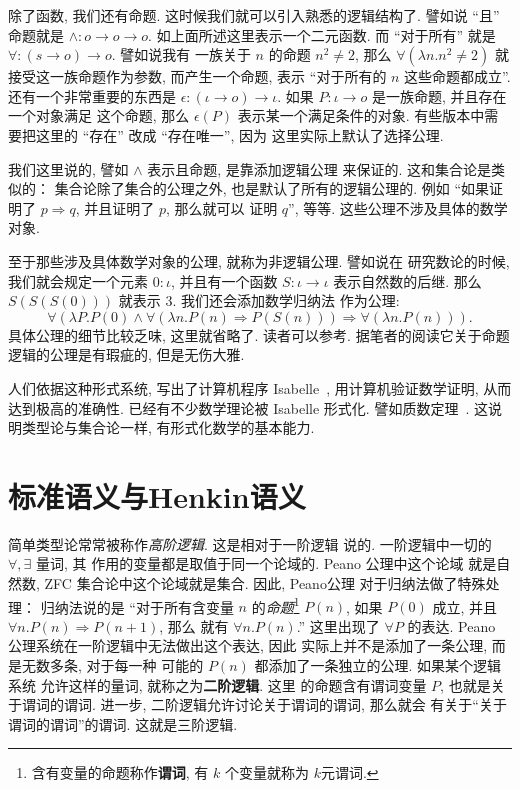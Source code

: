 除了函数, 我们还有命题. 这时候我们就可以引入熟悉的逻辑结构了.
譬如说 “且” 命题就是 \(\wedge : o \to o \to o\).
如上面所述这里表示一个二元函数. 而 “对于所有” 就是
\(\forall : (s \to o) \to o\). 譬如说我有
一族关于 \(n\) 的命题 \(n^2 \ne 2\),
那么 \(\forall (\lambda n. n^2 \ne 2)\)
就接受这一族命题作为参数, 而产生一个命题, 表示 “对于所有的
\(n\) 这些命题都成立”. 还有一个非常重要的东西是
\(\epsilon : (\iota \to o) \to \iota\). 如果
\(P : \iota \to o\) 是一族命题, 并且存在一个对象满足
这个命题, 那么 \(\epsilon(P)\) 表示某一个满足条件的对象.
有些版本中需要把这里的 “存在” 改成 “存在唯一”, 因为
这里实际上默认了选择公理.

我们这里说的, 譬如 \(\wedge\) 表示且命题, 是靠添加逻辑公理
来保证的. 这和集合论是类似的： 集合论除了集合的公理之外,
也是默认了所有的逻辑公理的. 例如 “如果证明了
\(p \Rightarrow q\), 并且证明了 \(p\), 那么就可以
证明 \(q\)”, 等等. 这些公理不涉及具体的数学对象.

至于那些涉及具体数学对象的公理, 就称为非逻辑公理. 譬如说在
研究数论的时候, 我们就会规定一个元素 \(0 : \iota\),
并且有一个函数 \(S : \iota \to \iota\) 表示自然数的后继.
那么 \(S(S(S(0)))\) 就表示 \(3\). 我们还会添加数学归纳法
作为公理:
\[\forall (\lambda P. P(0) \wedge
\forall(\lambda n. P(n)\Rightarrow P(S(n)))
\Rightarrow \forall (\lambda n. P(n))).\]
具体公理的细节比较乏味, 这里就省略了. 读者可以参考\cite{farmer:2008:virtues}.
据笔者的阅读它关于命题逻辑的公理是有瑕疵的, 但是无伤大雅.

人们依据这种形式系统, 写出了计算机程序 Isabelle~\cite{tobias:2002:isabelle},
用计算机验证数学证明, 从而达到极高的准确性.
已经有不少数学理论被 Isabelle 形式化.
譬如质数定理~\cite{eberl:2018:pnt}.
这说明类型论与集合论一样, 有形式化数学的基本能力.

\section{标准语义与Henkin语义}\label{beginning:henkin}
简单类型论常常被称作\emph{高阶逻辑}. 这是相对于一阶逻辑
说的. 一阶逻辑中一切的 \(\forall, \exists\) 量词, 其
作用的变量都是取值于同一个论域的. Peano 公理中这个论域
就是自然数, ZFC 集合论中这个论域就是集合. 因此, Peano公理
对于归纳法做了特殊处理： 归纳法说的是 “对于所有含变量
\(n\) 的\emph{命题}\footnote{含有变量的命题称作\textbf{谓词},
有 \(k\) 个变量就称为 \(k\)元谓词.}
\(P(n)\), 如果 \(P(0)\) 成立,
并且 \(\forall n. P(n) \Rightarrow P(n+1)\), 那么
就有 \(\forall n. P(n)\).” 这里出现了 \(\forall P\)
的表达. Peano 公理系统在一阶逻辑中无法做出这个表达, 因此
实际上并不是添加了一条公理, 而是无数多条, 对于每一种
可能的 \(P(n)\) 都添加了一条独立的公理. 如果某个逻辑系统
允许这样的量词, 就称之为\textbf{二阶逻辑}. 这里
的命题含有谓词变量 \(P\), 也就是关于谓词的谓词.
进一步, 二阶逻辑允许讨论关于谓词的谓词, 那么就会
有关于“关于谓词的谓词”的谓词. 这就是三阶逻辑.

